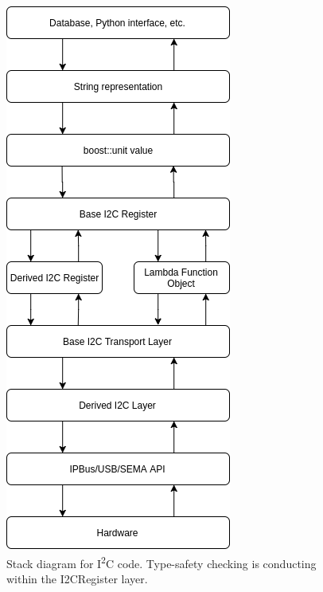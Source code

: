 \documentclass[a4paper,11pt,twocolumn]{article}
\begin{document}
	\begin{figure}
		\centering
		\includegraphics[width=\columnwidth]{stack-diagram}
		\caption{Stack diagram for I\textsuperscript{2}C code. Type-safety checking is conducting within the I2CRegister layer.}
	\end{figure}
\end{document}
